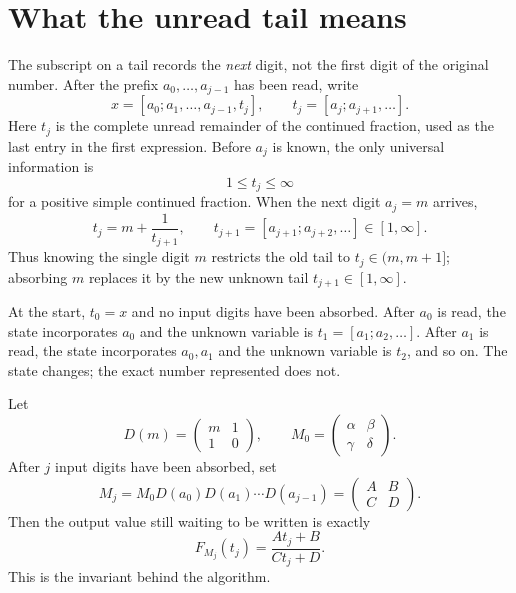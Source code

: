 \section{What the unread tail means}

The subscript on a tail records the \emph{next} digit, not the first digit of
the original number.  After the prefix $a_0,\dots,a_{j-1}$ has been read, write
\begin{equation}
  x=[a_0;a_1,\dots,a_{j-1},t_j],
  \qquad
  t_j=[a_j;a_{j+1},\dots].                         \label{eq:tail-invariant}
\end{equation}
Here $t_j$ is the complete unread remainder of the continued fraction, used as
the last entry in the first expression.  Before $a_j$ is known, the only
universal information is
\[
  1\leq t_j\leq\infty
\]
for a positive simple continued fraction.  When the next digit $a_j=m$ arrives,
\begin{equation}
  t_j=m+\frac1{t_{j+1}},
  \qquad t_{j+1}=[a_{j+1};a_{j+2},\dots]\in[1,\infty].
  \label{eq:tail-shift}
\end{equation}
Thus knowing the single digit $m$ restricts the old tail to
$t_j\in(m,m+1]$; absorbing $m$ replaces it by the new unknown tail
$t_{j+1}\in[1,\infty]$.

\begin{labbox}[title={Known prefix versus unknown tail}]
At the start, $t_0=x$ and no input digits have been absorbed.  After $a_0$ is
read, the state incorporates $a_0$ and the unknown variable is
$t_1=[a_1;a_2,\dots]$.  After $a_1$ is read, the state incorporates
$a_0,a_1$ and the unknown variable is $t_2$, and so on.  The state changes;
the exact number represented does not.
\end{labbox}

Let
\[
  D(m)=\begin{pmatrix}m&1\\1&0\end{pmatrix},
  \qquad
  M_0=\begin{pmatrix}\alpha&\beta\\\gamma&\delta\end{pmatrix}.
\]
After $j$ input digits have been absorbed, set
\begin{equation}
  M_j=M_0D(a_0)D(a_1)\cdots D(a_{j-1})
      =\begin{pmatrix}A&B\\C&D\end{pmatrix}.       \label{eq:prefix-state}
\end{equation}
Then the output value still waiting to be written is exactly
\[
  F_{M_j}(t_j)=\frac{At_j+B}{Ct_j+D}.
\]
This is the invariant behind the algorithm.

